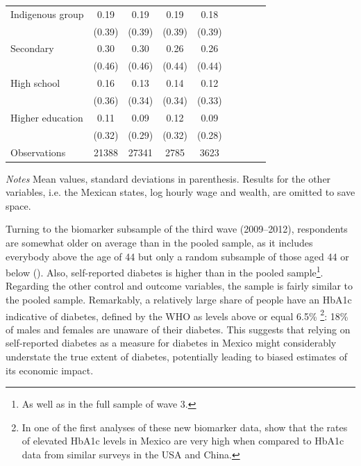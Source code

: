 \begin{table}[p]
\begin{adjustbox}{max width=\linewidth, center}
\begin{threeparttable}
{\begin{tabular}{l*{4}{SS}}
Indigenous group    &        0.19&        0.19&        0.19&        0.18\\
                    &      (0.39)&      (0.39)&      (0.39)&      (0.39)\\
Secondary           &        0.30&        0.30&        0.26&        0.26\\
                    &      (0.46)&      (0.46)&      (0.44)&      (0.44)\\
High school         &        0.16&        0.13&        0.14&        0.12\\
                    &      (0.36)&      (0.34)&      (0.34)&      (0.33)\\
Higher education    &        0.11&        0.09&        0.12&        0.09\\
                    &      (0.32)&      (0.29)&      (0.32)&      (0.28)\\
\midrule
Observations        &    21388&       27341&        2785&        3623\\
\bottomrule
\end{tabular}
\begin{tablenotes}
\item \footnotesize \textit{Notes} Mean values, standard deviations in parenthesis. Results for the other variables, i.e. the Mexican states, log hourly wage and wealth, are omitted to save space.
\end{tablenotes}
}
\end{threeparttable}
\end{adjustbox}
\end{table}


Turning to the biomarker subsample of the third wave (2009--2012), respondents are somewhat older on average than in the pooled sample, as it includes everybody above the age of 44 but only a random subsample of those aged 44 or below (\cite{Crimmins2015}). Also, self-reported diabetes is higher than in the pooled sample\footnote{As well as in the full sample of wave 3.}. Regarding the other control and outcome variables, the sample is fairly similar to the pooled sample. Remarkably, a relatively large share of people have an \ac{HbA1c} indicative of diabetes, defined by the \ac{WHO} as levels above or equal 6.5\% \parencite{WorldHealthOrganization2011}\footnote{In one of the first analyses of these new biomarker data, \textcite{Frankenberg2015} show that the rates of elevated \ac{HbA1c} levels in Mexico are very high when compared to \ac{HbA1c} data from similar surveys in the USA and China.}: 18\% of males and females are unaware of their diabetes. This suggests that relying on self-reported diabetes as a measure for diabetes in Mexico might considerably understate the true extent of diabetes, potentially leading to biased estimates of its economic impact.

